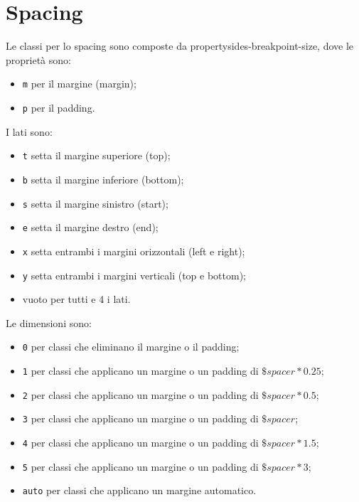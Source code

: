 \documentclass{article}
\begin{document}
\section{Spacing}
Le classi per lo spacing sono composte da {property}{sides}-{breakpoint}-{size}, dove le proprietà sono:
\begin{itemize}
    \item \texttt{m} per il margine (margin);
    \item \texttt{p} per il padding.
\end{itemize}
I lati sono:
\begin{itemize}
    \item \texttt{t} setta il margine superiore (top);
    \item \texttt{b} setta il margine inferiore (bottom);
    \item \texttt{s} setta il margine sinistro (start);
    \item \texttt{e} setta il margine destro (end);
    \item \texttt{x} setta entrambi i margini orizzontali (left e right);
    \item \texttt{y} setta entrambi i margini verticali (top e bottom);
    \item vuoto per tutti e 4 i lati.
\end{itemize}
Le dimensioni sono:
\begin{itemize}
    \item \texttt{0} per classi che eliminano il margine o il padding;
    \item \texttt{1} per classi che applicano un margine o un padding di $\$spacer * 0.25$;
    \item \texttt{2} per classi che applicano un margine o un padding di $\$spacer * 0.5$;
    \item \texttt{3} per classi che applicano un margine o un padding di $\$spacer$;
    \item \texttt{4} per classi che applicano un margine o un padding di $\$spacer * 1.5$;
    \item \texttt{5} per classi che applicano un margine o un padding di $\$spacer * 3$;
    \item \texttt{auto} per classi che applicano un margine automatico.
\end{itemize}
\end{document}
